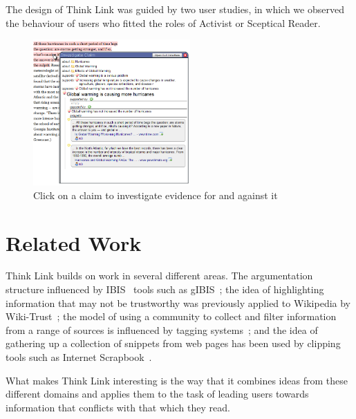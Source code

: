 \documentclass{chi2009}
\begin{document}
The design of Think Link was guided by two user studies, in which we observed the behaviour of users who fitted the roles of Activist or Sceptical Reader. 

\begin{figure}[tb]
	\begin{center}
	\includegraphics[width=6cm]{../screenshots/claim_popup_crop2.png}
	\caption{Click on a claim to investigate evidence for and against it}
	\label{claimview}
	\end{center}
\end{figure}



\section{Related Work}

Think Link builds on work in several different areas. The argumentation structure influenced by IBIS~\cite{Rittel1973} tools such as gIBIS~\cite{Conklin1987}; the idea of highlighting information that may not be trustworthy was previously applied to Wikipedia by Wiki-Trust~\cite{Adler2008}; the model of using a community to collect and filter information from a range of sources is influenced by tagging systems~\cite{Marlow2006}; and the idea of gathering up a collection of snippets from web pages has been used by clipping tools such as Internet Scrapbook~\cite{Sugiura1998}. 

What makes Think Link interesting is the way that it combines ideas from these different domains and applies them to the task of leading users towards information that conflicts with that which they read.
\end{document}
